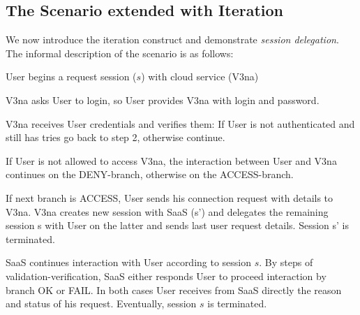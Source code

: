\documentclass[10pt]{llncs}
\begin{document}
\subsection{The Scenario extended with Iteration}
We now introduce the iteration construct and demonstrate \textit{session delegation}.
The informal description of the scenario is as follows:
\begin{compactenum}
\item  User begins a request session ($s$) with cloud service (V3na)

\item  V3na asks User to login, so User provides V3na with login and password.

\item  V3na receives User credentials and verifies them: If User is not authenticated and still has tries%
go back to step 2, otherwise continue.

\item  If User is not allowed to access V3na, the interaction between User and V3na continues on the DENY-branch, otherwise on the ACCESS-branch.

\item  If next branch is ACCESS, User sends his connection request with details to V3na. V3na creates new session with SaaS (s') and delegates the remaining session s with User on the latter and sends last user request details. Session s' is terminated.

\item  SaaS continues interaction with User according to session $s$. By steps of validation-verification, SaaS either responds User to proceed interaction by branch OK or FAIL. In both cases User receives from SaaS directly the reason and status of his request. Eventually, session $s$ is terminated.
\end{compactenum}
\end{document}
